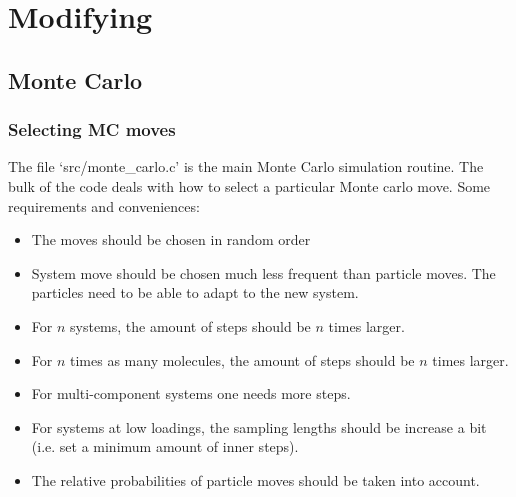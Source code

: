 \section{Modifying}

\subsection{Monte Carlo}

\subsubsection*{Selecting MC moves}
The file `src/monte\_carlo.c' is the main Monte Carlo simulation routine. The bulk of the code deals with how to select a particular Monte carlo move.
Some requirements and conveniences:
\begin{itemize}
  \item{The moves should be chosen in random order}
  \item{System move should be chosen much less frequent than particle moves. The particles need to be able to adapt to the new system.}
  \item{For $n$ systems, the amount of steps should be $n$ times larger.}
  \item{For $n$ times as many molecules, the amount of steps should be $n$ times larger.}
  \item{For multi-component systems one needs more steps.}
  \item{For systems at low loadings, the sampling lengths should be increase a bit (i.e. set a minimum amount of inner steps).}
  \item{The relative probabilities of particle moves should be taken into account.}
\end{itemize}

